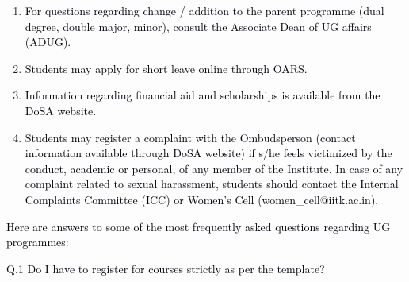 \documentclass[12pt]{article}
\begin{document}
\begin{enumerate}[label*={\fontsize{10pt}{10pt}\selectfont \arabic*.}]
\vspace{\baselineskip}
	\item {\fontsize{10pt}{12.0pt}\selectfont \textcolor[HTML]{00000A}{For questions regarding change / addition to the parent programme (dual degree, double major, minor), consult the Associate Dean of UG affairs (ADUG).}\par}\par


\vspace{\baselineskip}
	\item {\fontsize{10pt}{12.0pt}\selectfont \textcolor[HTML]{00000A}{Students may apply for short leave online through OARS.}\par}\par


\vspace{\baselineskip}
	\item {\fontsize{10pt}{12.0pt}\selectfont \textcolor[HTML]{00000A}{Information regarding financial aid and scholarships is available from the DoSA website.}\par}\par


\vspace{\baselineskip}
	\item {\fontsize{10pt}{12.0pt}\selectfont \textcolor[HTML]{00000A}{Students may register a complaint with the Ombudsperson (contact information available through DoSA website) if s/he feels victimized by the conduct, academic or personal, of any member of the Institute. In case of any complaint related to sexual harassment, students should contact the Internal Complaints Committee (ICC) or Women’s Cell (women\_cell@iitk.ac.in).}\par}
\end{enumerate}\par


\vspace{\baselineskip}
{\fontsize{10pt}{12.0pt}\selectfont \textcolor[HTML]{00000A}{Here are answers to some of the most frequently asked questions regarding UG programmes:}\par}\par


\vspace{\baselineskip}
{\fontsize{10pt}{12.0pt}\selectfont \textcolor[HTML]{00000A}{Q.1 Do I have to register for courses strictly as per the template?}\par}\par
\end{document}
